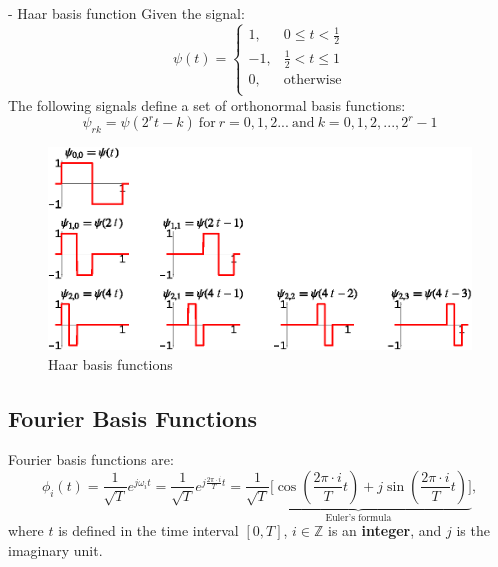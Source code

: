 \begin{ex}{- Haar basis function}
Given the signal:
\[ \psi(t) = 
\begin{cases}
    1,      &   0 \leq t < \frac{1}{2}\\
    -1,     &   \frac{1}{2} < t \leq 1\\
    0,      &   \text{otherwise}\\
\end{cases} \]
The following signals define a set of orthonormal basis functions:
\[ 
    \psi_{rk} = \psi(2^{r}t-k) \ \text{for} \ r=0,1,2... \ \text{and} \ k=0,1,2,...,2^{r}-1 
\]

 \begin{figure}[H]
     \centering
     \includegraphics[width = \textwidth]{images/Haar_func.eps}
     \caption{Haar basis functions} 
 \end{figure}
\end{ex}
\subsection{Fourier Basis Functions}
Fourier basis functions are:
\[
    \phi_{i}(t) = \frac{1}{\sqrt{T}} e^{j\omega_{i} t} =  \frac{1}{\sqrt{T}} e^{j\frac{2\pi\cdot i}{T} t} = \underbrace{\frac{1}{\sqrt{T}} \bigg[ \cos(\frac{2\pi \cdot i}{T} t) + j\sin(\frac{2\pi \cdot i}{T} t) \bigg]}_{\text{Euler's formula}},
\]
where $t$ is defined in the time interval $[0,T]$, $i \in \mathbb{Z}$ is an \textbf{integer}, and $j$ is the imaginary unit.\\

